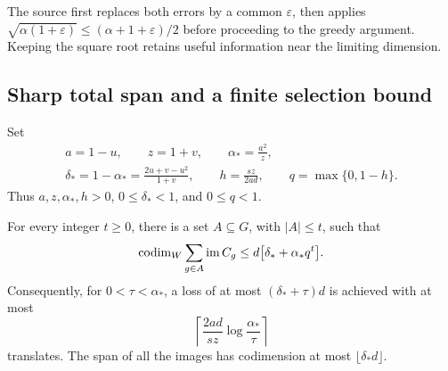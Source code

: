 The source first replaces both errors by a common \(\varepsilon\), then applies
\(\sqrt{\alpha(1+\varepsilon)}\le(\alpha+1+\varepsilon)/2\)
before proceeding to the greedy argument. Keeping the square root
retains useful information near the limiting dimension.

\subsection{Sharp total span and a finite selection bound}

Set
\begin{equation}\label{eq:parameters}
\begin{gathered}
 a=1-u,\qquad z=1+v,\qquad
 \alpha_*=\frac{a^2}{z},\\[3pt]
 \delta_*=1-\alpha_*=
 \frac{2u+v-u^2}{1+v},
 \qquad h=\frac{s z}{2ad},\qquad q=\max\{0,1-h\}.
\end{gathered}
\end{equation}
Thus \(a,z,\alpha_*,h>0\), \(0\le\delta_*<1\), and
\(0\le q<1\).

\begin{theorem}\label{thm:greedy}
For every integer \(t\ge0\), there is a set \(A\subseteq G\),
with \(|A|\le t\), such that
\begin{equation}\label{eq:greedy}
 \operatorname{codim}_W\sum_{g\in A}\operatorname{im} C_g
 \le d\bigl[\delta_*+\alpha_*q^t\bigr].
\end{equation}
Consequently, for \(0<\tau<\alpha_*\), a loss of at most
\((\delta_*+\tau)d\) is achieved with at most
\begin{equation}\label{eq:count}
 \left\lceil\frac{2ad}{sz}\log\frac{\alpha_*}{\tau}\right\rceil
\end{equation}
translates. The span of all the images has codimension at most
\(\lfloor\delta_*d\rfloor\).
\end{theorem}

